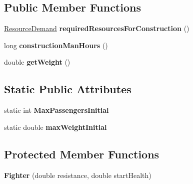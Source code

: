 \subsection*{Public Member Functions}
\begin{DoxyCompactItemize}
\item 
\hyperlink{classuniverse_1_1_resource_demand}{Resource\+Demand} {\bfseries required\+Resources\+For\+Construction} ()\hypertarget{classtools_1_1vehicles_1_1space_1_1_fighter_a657457d6fc336445367ee0ec2a557855}{}\label{classtools_1_1vehicles_1_1space_1_1_fighter_a657457d6fc336445367ee0ec2a557855}

\item 
long {\bfseries construction\+Man\+Hours} ()\hypertarget{classtools_1_1vehicles_1_1space_1_1_fighter_a7e95a255a0bcb541bbdff892942b3683}{}\label{classtools_1_1vehicles_1_1space_1_1_fighter_a7e95a255a0bcb541bbdff892942b3683}

\item 
double {\bfseries get\+Weight} ()\hypertarget{classtools_1_1vehicles_1_1space_1_1_fighter_aaec5c3f93008d68f37a7c06bf6552fa5}{}\label{classtools_1_1vehicles_1_1space_1_1_fighter_aaec5c3f93008d68f37a7c06bf6552fa5}

\end{DoxyCompactItemize}
\subsection*{Static Public Attributes}
\begin{DoxyCompactItemize}
\item 
static int {\bfseries Max\+Passengers\+Initial}\hypertarget{classtools_1_1vehicles_1_1space_1_1_fighter_aa97c7b86e70d71490eb3c060a5d4311f}{}\label{classtools_1_1vehicles_1_1space_1_1_fighter_aa97c7b86e70d71490eb3c060a5d4311f}

\item 
static double {\bfseries max\+Weight\+Initial}\hypertarget{classtools_1_1vehicles_1_1space_1_1_fighter_a506b9cc446ff8129df527b12225196ea}{}\label{classtools_1_1vehicles_1_1space_1_1_fighter_a506b9cc446ff8129df527b12225196ea}

\end{DoxyCompactItemize}
\subsection*{Protected Member Functions}
\begin{DoxyCompactItemize}
\item 
{\bfseries Fighter} (double resistance, double start\+Health)\hypertarget{classtools_1_1vehicles_1_1space_1_1_fighter_a068ee9dc67afe309921fa4193a594a10}{}\label{classtools_1_1vehicles_1_1space_1_1_fighter_a068ee9dc67afe309921fa4193a594a10}

\end{DoxyCompactItemize}
